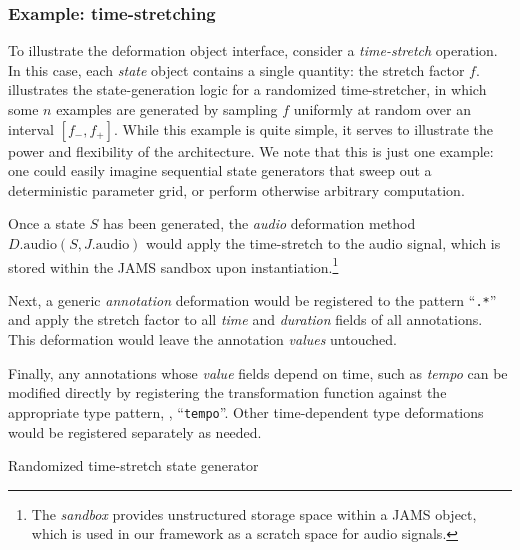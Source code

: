 \documentclass{article}
\begin{document}
\subsubsection{Example: time-stretching}
To illustrate the deformation object interface, consider a \emph{time-stretch} operation.
In this case, each \emph{state} object contains a single quantity: the stretch factor $f$.
 illustrates the state-generation logic for a randomized
time-stretcher, in which some $n$ examples are generated by sampling $f$ uniformly at
random over an interval $[f_-, f_+]$.  While this example is quite
simple, it serves to illustrate the power and flexibility of the architecture.  We note
that this is just one example: one could easily imagine sequential state generators that
sweep out a deterministic parameter grid, or perform otherwise arbitrary computation.

Once a state $S$ has been generated, the \emph{audio} deformation method
$D.\text{audio}(S, J.\text{audio})$ 
would apply the time-stretch to the audio signal, which is stored within the 
JAMS sandbox upon instantiation.\footnote{The \emph{sandbox} provides unstructured 
storage space within a JAMS object, which is used in our framework as a scratch space for 
audio signals.}

Next, a generic \emph{annotation} deformation would be registered to the pattern
``\texttt{.*}'' and apply the stretch factor to all \emph{time} and \emph{duration} 
fields of all annotations.  This deformation would leave the annotation 
\emph{values} untouched.

Finally, any annotations whose \emph{value} fields depend on time, such as \emph{tempo}
can be modified directly by registering the transformation function against the
appropriate type pattern, \eg, ``\texttt{tempo}''.  Other time-dependent type
deformations would be registered separately as needed.

\begin{algorithm}[t]
    \caption{Randomized time-stretch state generator\label{alg:timestate}}
    \begin{algorithmic}[1]
            \EndFor{}
        \EndFunction{}
    \end{algorithmic}
\end{algorithm}
\end{document}
